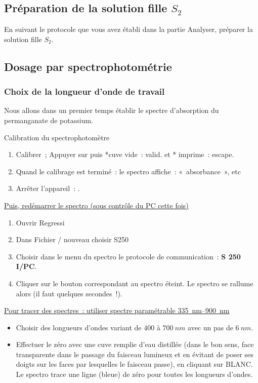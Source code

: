 \documentclass[a4paper, 11pt, final, garamond]{book}
\begin{document}
\subsection{Préparation de la solution fille $S_2$}

En suivant le protocole que vous avez établi dans la partie Analyser, préparer
la solution fille $S_2$.

\subsection{Dosage par spectrophotométrie}
\subsubsection{Choix de la longueur d'onde de travail}

Nous allons dans un premier temps établir le spectre d'absorption du
permanganate de potassium.

\medskip

\begin{instruc}{Calibration du spectrophotomètre}
    \begin{enumerate}
        \item Calibrer~; Appuyer sur  puis   *cuve vide~: valid. et *
            imprime~: escape.
        \item Quand le calibrage est terminé~: le spectro affiche~:
            «~absorbance~», etc
        \item Arrêter l'appareil~: .
    \end{enumerate}
\end{instruc}

\underline{Puis, redémarrer le spectro (sous contrôle du PC cette fois)}
\begin{enumerate}
    \item Ouvrir Regressi
    \item Dans Fichier / nouveau choisir S250
    \item Choisir dans le menu du spectro le protocole de communication~:
        \textbf{S 250 I/PC}.
    \item Cliquer sur le bouton correspondant au spectro éteint. Le spectro se
        rallume alors (il faut quelques secondes~!).
\end{enumerate}

\underline{Pour tracer des spectres~: utiliser spectre paramétrable
\SIrange{335}{900}{nm}}
\begin{itemize}
    \item Choisir des longueurs d'ondes variant de $400$ à $\SI{700}{nm}$ avec
        un pas de $\SI{6}{nm}$.
    \item Effectuer le zéro avec une cuve remplie d'eau distillée (dans le bon
        sens, face transparente dans le passage du faisceau lumineux et en
        évitant de poser ses doigts sur les faces par lesquelles le faisceau
        passe), en cliquant sur  BLANC. Le spectro trace une ligne (bleue) de
        zéro pour toutes les longueurs d'ondes.
\end{itemize}
\end{document}
